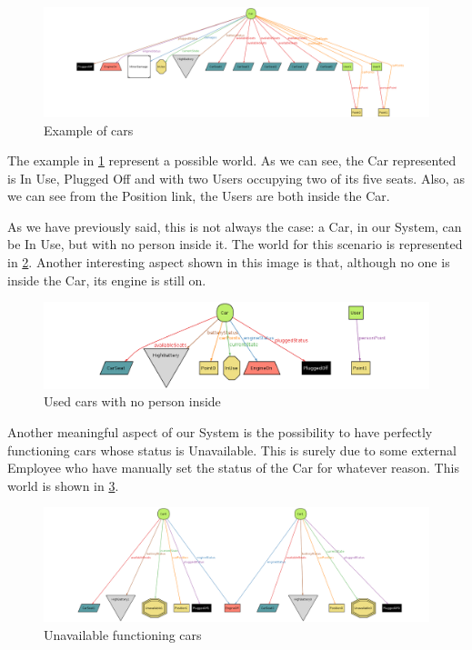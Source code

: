 \begin{figure}[!htbp]
\centering
\includegraphics[width=\linewidth,keepaspectratio]{../Alloy/Exported/Images/Cars_1.png}
\caption{Example of cars}
\label{fig:Cars1}
\end{figure}
\FloatBarrier
The example in \ref{fig:Cars1} represent a possible world. As we can see, the Car represented is In Use, Plugged Off and with two Users occupying two of its five seats. Also, as we can see from the Position link, the Users are both inside the Car. 

As we have previously said, this is not always the case: a Car, in our System, can be In Use, but with no person inside it. The world for this scenario is represented in \ref{fig:CarsNoneInside}. Another interesting aspect shown in this image is that, although no one is inside the Car, its engine is still on.

\begin{figure}[!htbp]
\centering
\includegraphics[width=\linewidth,keepaspectratio]{../Alloy/Exported/Images/Cars_NoPersonInsideInUseCar.png}
\caption{Used cars with no person inside}
\label{fig:CarsNoneInside}
\end{figure}
\FloatBarrier

Another meaningful aspect of our System is the possibility to have perfectly functioning cars whose status is Unavailable. This is surely due to some external Employee who have manually set the status of the Car for whatever reason. This world is shown in \ref{fig:PerfectCarsUnavailable}. 

\begin{figure}[!htbp]
\centering
\includegraphics[width=\linewidth,keepaspectratio]{../Alloy/Exported/Images/UnavailableFunctioningCars.png}
\caption{Unavailable functioning cars}
\label{fig:PerfectCarsUnavailable}
\end{figure}
\FloatBarrier

